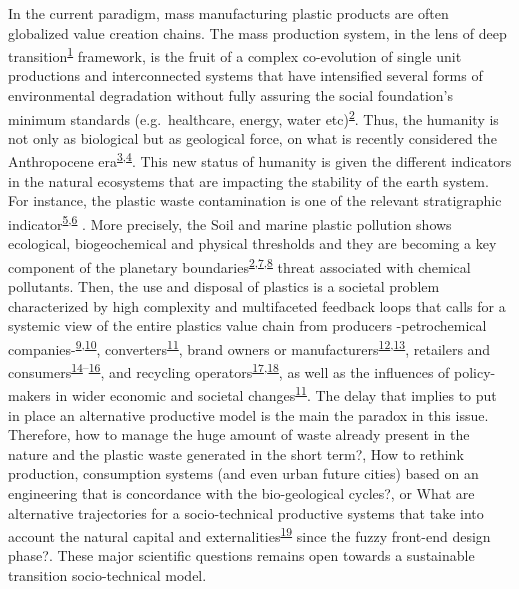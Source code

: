 \documentclass[
  12pt,
  a4paperpaper,
  onecolumn]{article}
\begin{document}
In the current paradigm, mass manufacturing plastic products are often
globalized value creation chains. The mass production system, in the
lens of deep
transition\textsuperscript{\protect\hyperlink{ref-kanger2022}{1}}
framework, is the fruit of a complex co-evolution of single unit
productions and interconnected systems that have intensified several
forms of environmental degradation without fully assuring the social
foundation's minimum standards (e.g.~healthcare, energy, water
etc)\textsuperscript{\protect\hyperlink{ref-raworth2017}{2}}. Thus, the
humanity is not only as biological but as geological force, on what is
recently considered the Anthropocene
era\textsuperscript{\protect\hyperlink{ref-steffen2018}{3},\protect\hyperlink{ref-steffen2011}{4}}.
This new status of humanity is given the different indicators in the
natural ecosystems that are impacting the stability of the earth system.
For instance, the plastic waste contamination is one of the relevant
stratigraphic
indicator\textsuperscript{\protect\hyperlink{ref-porta2021}{5},\protect\hyperlink{ref-de-la-torre2021}{6}
}. More precisely, the Soil and marine plastic pollution shows
ecological, biogeochemical and physical thresholds and they are becoming
a key component of the planetary
boundaries\textsuperscript{\protect\hyperlink{ref-raworth2017}{2},\protect\hyperlink{ref-ONeill2018}{7},\protect\hyperlink{ref-Rockstrom2009}{8}}
threat associated with chemical pollutants. Then, the use and disposal
of plastics is a societal problem characterized by high complexity and
multifaceted feedback loops that calls for a systemic view of the entire
plastics value chain from producers -petrochemical
companies-\textsuperscript{\protect\hyperlink{ref-Iles2013}{9},\protect\hyperlink{ref-DeVargasMores2018}{10}},
converters\textsuperscript{\protect\hyperlink{ref-Paletta2019}{11}},
brand owners or
manufacturers\textsuperscript{\protect\hyperlink{ref-Gong2020}{12},\protect\hyperlink{ref-Ma2020}{13}},
retailers and
consumers\textsuperscript{\protect\hyperlink{ref-Confente2020}{14}--\protect\hyperlink{ref-Filho2021}{16}},
and recycling
operators\textsuperscript{\protect\hyperlink{ref-Huysveld2019}{17},\protect\hyperlink{ref-Pazienza2020}{18}},
as well as the influences of policy-makers in wider economic and
societal
changes\textsuperscript{\protect\hyperlink{ref-Paletta2019}{11}}. The
delay that implies to put in place an alternative productive model is
the main the paradox in this issue. Therefore, how to manage the huge
amount of waste already present in the nature and the plastic waste
generated in the short term?, How to rethink production, consumption
systems (and even urban future cities) based on an engineering that is
concordance with the bio-geological cycles?, or What are alternative
trajectories for a socio-technical productive systems that take into
account the natural capital and
externalities\textsuperscript{\protect\hyperlink{ref-zhen2021}{19}}
since the fuzzy front-end design phase?. These major scientific
questions remains open towards a sustainable transition socio-technical
model.
\end{document}
